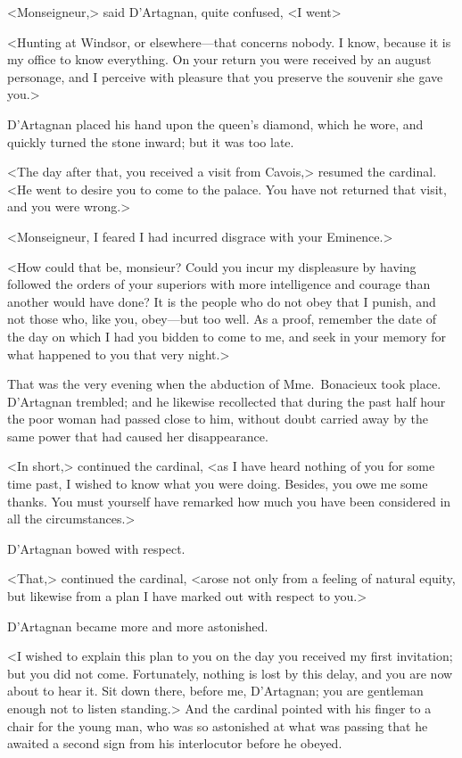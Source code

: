 <Monseigneur,> said D'Artagnan, quite confused, <I went\longdash> 

<Hunting at Windsor, or elsewhere—that concerns nobody. I know, because it is my office to know everything. On your return you were received by an august personage, and I perceive with pleasure that you preserve the souvenir she gave you.> 

D'Artagnan placed his hand upon the queen's diamond, which he wore, and quickly turned the stone inward; but it was too late. 

<The day after that, you received a visit from Cavois,> resumed the cardinal. <He went to desire you to come to the palace. You have not returned that visit, and you were wrong.> 

<Monseigneur, I feared I had incurred disgrace with your Eminence.> 

<How could that be, monsieur? Could you incur my displeasure by having followed the orders of your superiors with more intelligence and courage than another would have done? It is the people who do not obey that I punish, and not those who, like you, obey—but too well. As a proof, remember the date of the day on which I had you bidden to come to me, and seek in your memory for what happened to you that very night.> 

That was the very evening when the abduction of Mme.~Bonacieux took place. D'Artagnan trembled; and he likewise recollected that during the past half hour the poor woman had passed close to him, without doubt carried away by the same power that had caused her disappearance. 

<In short,> continued the cardinal, <as I have heard nothing of you for some time past, I wished to know what you were doing. Besides, you owe me some thanks. You must yourself have remarked how much you have been considered in all the circumstances.> 

D'Artagnan bowed with respect. 

<That,> continued the cardinal, <arose not only from a feeling of natural equity, but likewise from a plan I have marked out with respect to you.> 

D'Artagnan became more and more astonished. 

<I wished to explain this plan to you on the day you received my first invitation; but you did not come. Fortunately, nothing is lost by this delay, and you are now about to hear it. Sit down there, before me, D'Artagnan; you are gentleman enough not to listen standing.> And the cardinal pointed with his finger to a chair for the young man, who was so astonished at what was passing that he awaited a second sign from his interlocutor before he obeyed. 

